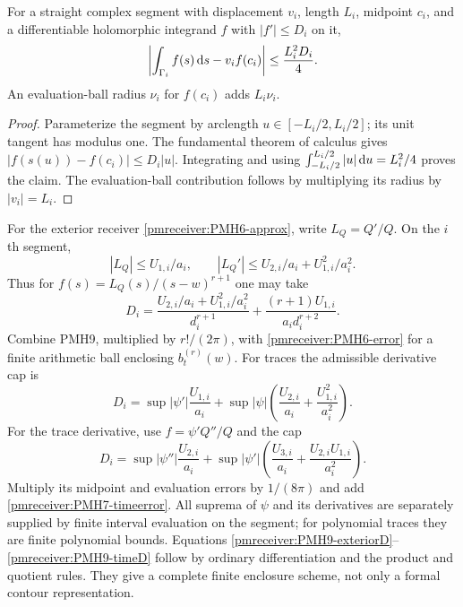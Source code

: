 \begin{pmreceiverlemma}
\label{pmreceiver:PMH9}
For a straight complex segment with displacement $v_i$, length
$L_i$, midpoint $c_i$, and a differentiable holomorphic integrand
$f$ with $|f'|\le D_i$ on it,
\begin{equation}\label{pmreceiver:PMH9-midpoint}
 \left|\int_{\Gamma_i}f(s)\,\mathrm d s-v_if(c_i)\right|
 \le\frac{L_i^2D_i}{4}.
\end{equation}
An evaluation-ball radius $\nu_i$ for $f(c_i)$ adds $L_i\nu_i$.
\end{pmreceiverlemma}
\begin{proof}
Parameterize the segment by arclength $u\in[-L_i/2,L_i/2]$;
its unit tangent has modulus one. The fundamental theorem of
calculus gives $|f(s(u))-f(c_i)|\le D_i|u|$.
Integrating and using
$\int_{-L_i/2}^{L_i/2}|u|\,\mathrm d u=L_i^2/4$ proves the claim.
The evaluation-ball contribution follows by multiplying its radius
by $|v_i|=L_i$.
\end{proof}

For the exterior receiver \eqref{pmreceiver:PMH6-approx}, write
$L_Q=Q'/Q$. On the $i$th segment,
\[
 |L_Q|\le U_{1,i}/a_i,\qquad
 |L_Q'|\le U_{2,i}/a_i+U_{1,i}^2/a_i^2.
\]
Thus for $f(s)=L_Q(s)/(s-w)^{r+1}$ one may take
\begin{equation}\label{pmreceiver:PMH9-exteriorD}
 D_i=\frac{U_{2,i}/a_i+U_{1,i}^2/a_i^2}{d_i^{r+1}}
       +\frac{(r+1)U_{1,i}}{a_i d_i^{r+2}}.
\end{equation}
Combine PMH9, multiplied by $r!/(2\pi)$, with
\eqref{pmreceiver:PMH6-error} for a finite arithmetic ball enclosing
$b_t^{(r)}(w)$. For traces the admissible derivative cap is
\begin{equation}\label{pmreceiver:PMH9-traceD}
 D_i=\sup|\psi'|\frac{U_{1,i}}{a_i}
 +\sup|\psi|\left(\frac{U_{2,i}}{a_i}
                         +\frac{U_{1,i}^2}{a_i^2}\right).
\end{equation}
For the trace derivative, use $f=\psi'Q''/Q$ and the cap
\begin{equation}\label{pmreceiver:PMH9-timeD}
 D_i=\sup|\psi''|\frac{U_{2,i}}{a_i}
 +\sup|\psi'|\left(\frac{U_{3,i}}{a_i}
                         +\frac{U_{2,i}U_{1,i}}{a_i^2}\right).
\end{equation}
Multiply its midpoint and evaluation errors by $1/(8\pi)$ and add
\eqref{pmreceiver:PMH7-timeerror}. All suprema of $\psi$ and its derivatives
are separately supplied by finite interval evaluation on the
segment; for polynomial traces they are finite polynomial bounds.
Equations \eqref{pmreceiver:PMH9-exteriorD}--\eqref{pmreceiver:PMH9-timeD} follow by
ordinary differentiation and the product and quotient rules. They
give a complete finite enclosure scheme, not only a formal contour
representation.

